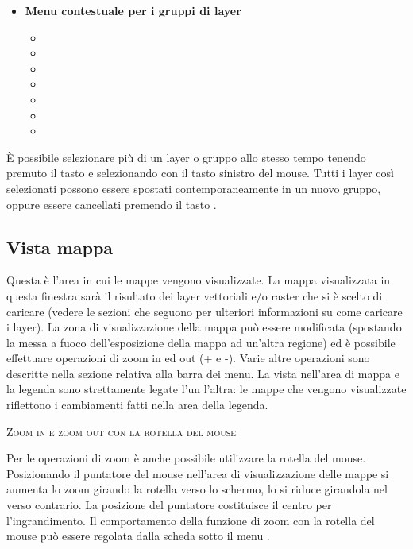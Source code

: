 \begin{itemize}
\item \textbf{Menu contestuale per i gruppi di layer} 
\begin{itemize}
\item {}
\item {}
\item {}
\item {}
\item {}
\item {}
\item {}
\end{itemize}

\end{itemize}

È possibile selezionare più di un layer o gruppo allo stesso tempo
tenendo premuto il tasto  e selezionando con il tasto sinistro del mouse. 
Tutti i layer così selezionati possono essere spostati contemporaneamente in un nuovo gruppo, oppure essere cancellati premendo il tasto .

\subsection{Vista mappa}\label{label_mapview}

Questa è l'area in cui le mappe vengono visualizzate. La mappa visualizzata in questa finestra sarà
il risultato dei layer vettoriali e/o raster che si è scelto di caricare (vedere le sezioni che seguono
per ulteriori informazioni su come caricare i layer). La zona di visualizzazione della mappa può
essere modificata (spostando la messa a fuoco dell'esposizione della mappa ad un'altra regione) ed
è possibile effettuare operazioni di zoom in ed out (+ e -). Varie altre operazioni sono descritte nella
sezione relativa alla barra dei menu. La vista nell'area di mappa e la legenda sono strettamente
legate l'un l'altra: le mappe che vengono visualizzate riflettono i cambiamenti fatti nella area
della legenda.  

\begin{Tip}\caption{\textsc{Zoom in e zoom out con la rotella del mouse}}
Per le operazioni di zoom è anche possibile utilizzare la rotella del mouse. 
Posizionando il puntatore del mouse nell'area di visualizzazione delle mappe si aumenta
lo zoom girando la rotella verso lo schermo, lo si riduce girandola nel verso contrario. La posizione del puntatore costituisce il centro per l'ingrandimento. Il comportamento della funzione di zoom con la rotella del mouse può essere
regolata dalla scheda  sotto il menu  \arrow {}. 
\end{Tip}

